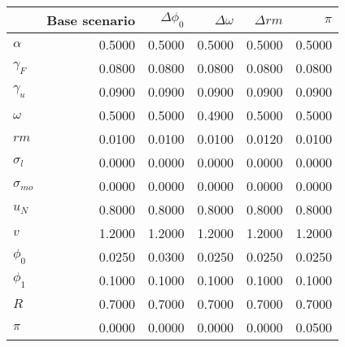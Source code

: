 \begin{tabular}{lrrrrr}
\toprule
{} &  Base scenario &  $\Delta \phi_0$ &  $\Delta \omega$ &  $\Delta rm$ &  $\pi$ \\
\midrule
$\alpha$      &         0.5000 &           0.5000 &           0.5000 &       0.5000 & 0.5000 \\
$\gamma_F$    &         0.0800 &           0.0800 &           0.0800 &       0.0800 & 0.0800 \\
$\gamma_u$    &         0.0900 &           0.0900 &           0.0900 &       0.0900 & 0.0900 \\
$\omega$      &         0.5000 &           0.5000 &           0.4900 &       0.5000 & 0.5000 \\
$rm$          &         0.0100 &           0.0100 &           0.0100 &       0.0120 & 0.0100 \\
$\sigma_{l}$  &         0.0000 &           0.0000 &           0.0000 &       0.0000 & 0.0000 \\
$\sigma_{mo}$ &         0.0000 &           0.0000 &           0.0000 &       0.0000 & 0.0000 \\
$u_N$         &         0.8000 &           0.8000 &           0.8000 &       0.8000 & 0.8000 \\
$v$           &         1.2000 &           1.2000 &           1.2000 &       1.2000 & 1.2000 \\
$\phi_0$      &         0.0250 &           0.0300 &           0.0250 &       0.0250 & 0.0250 \\
$\phi_1$      &         0.1000 &           0.1000 &           0.1000 &       0.1000 & 0.1000 \\
$R$           &         0.7000 &           0.7000 &           0.7000 &       0.7000 & 0.7000 \\
$\pi$         &         0.0000 &           0.0000 &           0.0000 &       0.0000 & 0.0500 \\
\bottomrule
\end{tabular}
